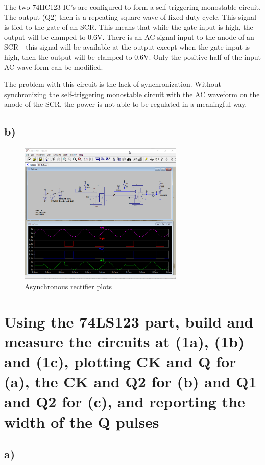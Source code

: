 \documentclass{article}
\begin{document}
	The two 74HC123 IC's are configured to form a self triggering monostable circuit. The output (Q2) then is a repeating square wave of fixed duty cycle. This signal is tied to the gate of an SCR. This means that while the gate input is high, the output will be clamped to 0.6V. There is an AC signal input to the anode of an SCR - this signal will be available at the output except when the gate input is high, then the output will be clamped to 0.6V. Only the positive half of the input AC wave form can be modified.
	
	The problem with this circuit is the lack of synchronization. Without synchronizing the self-triggering monostable circuit with the AC waveform on the anode of the SCR, the power is not able to be regulated in a meaningful way.
	


	\subsection*{b)}
	
	\begin{figure}[H]
	    \centering
	    \includegraphics[width=0.7\textwidth]{2b}
	    \caption{Asynchronous rectifier plots }
	\end{figure}



	\section{Using the 74LS123 part, build and measure the circuits at (1a), (1b) and (1c), plotting CK and Q for (a), the CK and Q2 for (b) and Q1 and Q2 for (c), and reporting the width of the Q pulses}
	
	\subsection*{a)}
	
\end{document}
